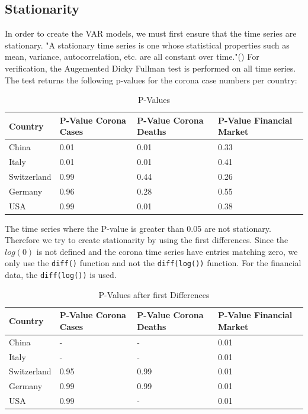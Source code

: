 \documentclass[11pt]{article}
\begin{document}
\subsection{Stationarity}
In order to create the VAR models, we must first ensure that the time series are stationary. "A stationary time series is one whose statistical properties such as mean, variance, autocorrelation, etc. are all constant over time."(\cite{Stationa72:online}) For verification, the Augemented Dicky Fullman test is performed on all time series. The test returns the following p-values for the corona case numbers per country:
\begin{table}[H]
\centering
\caption{P-Values }
\label{tab:p-values-corona}
\begin{tabular}{|l|l|l|l|}
\hline
\textbf{Country} &  \textbf{P-Value Corona Cases} & \textbf{P-Value Corona Deaths} & \textbf{P-Value Financial Market} \\ \hline
China            & 0.01 & 0.01 & 0.33            \\ \hline
Italy            & 0.01 & 0.01 & 0.41           \\ \hline
Switzerland      & 0.99 & 0.44 & 0.26          \\ \hline
Germany          & 0.96 & 0.28  & 0.55          \\ \hline
USA              & 0.99 & 0.01  & 0.38        \\ \hline
\end{tabular}
\end{table}
The time series where the P-value is greater than 0.05 are not stationary. Therefore we try to create stationarity by using the first differences. Since the $log(0)$ is not defined and the corona time series have entries matching zero, we only use the \lstinline{diff()} function and  not the \lstinline{diff(log())} function. For the financial data, the \lstinline{diff(log())} is used.
\begin{table}[h!]
\centering
\caption{P-Values after first Differences}
\label{tab:p-values-first-diff}
\begin{tabular}{|l|l|l|l|}
\hline
\textbf{Country} &\textbf{P-Value Corona Cases} & \textbf{P-Value Corona Deaths} & \textbf{P-Value Financial Market}  \\ \hline
China            & - & - & 0.01            \\ \hline
Italy            & - & - & 0.01          \\ \hline
Switzerland      & 0.95 & 0.99 & 0.01           \\ \hline
Germany          & 0.99 & 0.99 & 0.01           \\ \hline
USA              & 0.99 & -  & 0.01         \\ \hline
\end{tabular}
\end{table}
\end{document}
